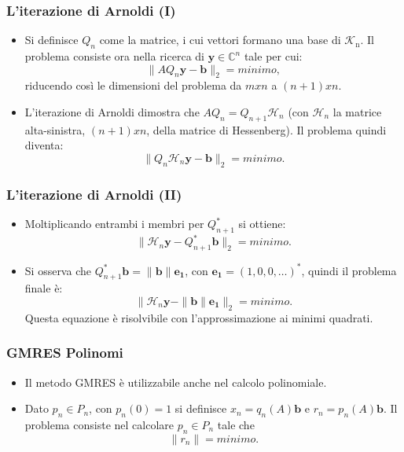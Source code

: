 \documentclass[10pt]{beamer}
\begin{document}
\begin{frame} \frametitle{L'iterazione di Arnoldi (I)}
\begin{itemize}
    \item Si definisce $Q_n$ come la matrice, i cui vettori formano una base di $\mathcal{K}_\mathrm{n}$. Il problema consiste ora nella ricerca di $\mathbf{y}\in\mathbb{C}^n$ tale per cui: $$\|AQ_n\mathbf{y}-\mathbf{b}\|_2 = minimo,$$ riducendo così le dimensioni del problema da $m x n$ a $(n+1) x n$.
    
    \item L'iterazione di Arnoldi dimostra che $AQ_n = Q_{n+1}\mathcal{H}_n$ (con $\mathcal{H}_n$ la matrice alta-sinistra, $(n+1) x n$, della matrice di Hessenberg). Il problema quindi diventa:$$\|Q_n\mathcal{H}_n\mathbf{y}-\mathbf{b}\|_2 = minimo.$$ 

\end{itemize}
\end{frame}

\begin{frame} \frametitle{L'iterazione di Arnoldi (II)}
\begin{itemize}
    \item Moltiplicando entrambi i membri per $Q^*_{n+1}$ si ottiene: $$\|\mathcal{H}_n\mathbf{y}-Q^*_{n+1}\mathbf{b}\|_2 = minimo.$$
    
    \item Si osserva che $Q^*_{n+1}\mathbf{b}=\|\mathbf{b}\|\mathbf{e_1}$, con $\mathbf{e_1}=(1,0,0,\dots)^*$, quindi il problema 
    finale è:$$\|\mathcal{H}_n\mathbf{y}-\|\mathbf{b}\|\mathbf{e_1}\|_2 = minimo.$$ Questa equazione è risolvibile con l'approssimazione ai minimi quadrati.

\end{itemize}
\end{frame}

\begin{frame} \frametitle{GMRES Polinomi}
\begin{itemize}
    \item Il metodo GMRES è utilizzabile anche nel calcolo polinomiale.
    
    \item Dato $p_n\in P_n$, con $p_n(0)=1$ si definisce $x_n=q_n(A)\mathbf{b}$ e $r_n=p_n(A)\mathbf{b}$. Il problema consiste nel calcolare $p_n\in P_n$ tale che $$\|r_n\|=minimo.$$

\end{itemize}
\end{frame}
\end{document}
